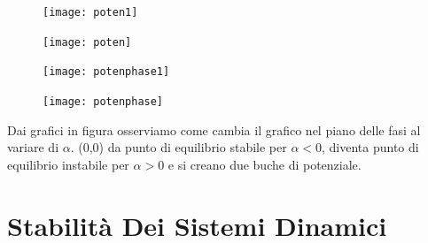 \begin{figure}[!ht]
\centering
\begin{minipage}{.5\textwidth}
  \centering
  \texttt{[image: poten1]}
  \end{minipage}%
\begin{minipage}{.5\textwidth}
  \centering
  \texttt{[image: poten]}
\end{minipage}
\end{figure}
\begin{figure}[!ht]
\centering
\begin{minipage}{.5\textwidth}
  \centering
  \texttt{[image: potenphase1]}
  \end{minipage}%
\begin{minipage}{.5\textwidth}
  \centering
  \texttt{[image: potenphase]}
\end{minipage}
\end{figure}

Dai grafici in figura osserviamo come cambia il grafico nel piano delle fasi al variare di $\alpha$. (0,0) da punto di equilibrio stabile per $\alpha <0$, diventa punto di equilibrio instabile  per $\alpha >0$ e si creano due buche di potenziale.

\section{Stabilit\`{a} Dei Sistemi Dinamici }


